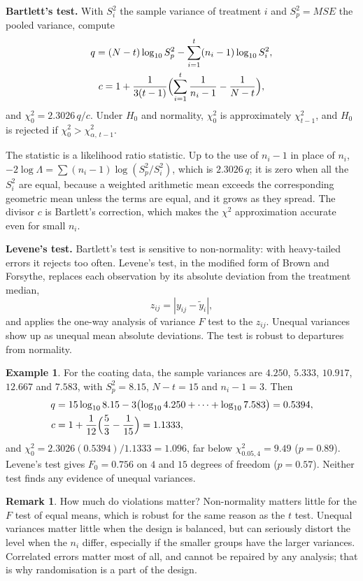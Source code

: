 \documentclass[11pt,a4paper]{article}
\numberwithin{equation}{section}
\theoremstyle{definition}
\newtheorem{exa}[thm]{Example}
\newtheorem*{remark}{Remark}
\begin{document}
\textbf{Bartlett's test.} With $S_i^2$ the sample variance of treatment $i$ and $S_p^2 = MSE$ the pooled variance, compute
\begin{gather*}
q = (N - t)\log_{10}S_p^2 - \sum_{i=1}^t(n_i - 1)\log_{10}S_i^2 , \\
c = 1 + \frac{1}{3(t - 1)}\Bigl(\sum_{i=1}^t\frac{1}{n_i - 1} - \frac{1}{N - t}\Bigr) ,
\end{gather*}
and $\chi_0^2 = 2.3026\,q/c$. Under $H_0$ and normality, $\chi_0^2$ is approximately $\chi^2_{t-1}$, and $H_0$ is rejected if $\chi_0^2 > \chi^2_{\alpha,\,t-1}$.

The statistic is a likelihood ratio statistic. Up to the use of $n_i - 1$ in place of $n_i$, $-2\log\Lambda = \sum(n_i - 1)\log(S_p^2/S_i^2)$, which is $2.3026\,q$; it is
zero when all the $S_i^2$ are equal, because a weighted arithmetic mean exceeds the corresponding geometric mean unless the terms are equal,
and it grows as they spread. The divisor $c$ is Bartlett's correction, which makes the $\chi^2$ approximation accurate even for small $n_i$.

\textbf{Levene's test.} Bartlett's test is sensitive to non-normality: with heavy-tailed errors it rejects too often. Levene's test, in the modified
form of Brown and Forsythe, replaces each observation by its absolute deviation from the treatment median,
\[
z_{ij} = |y_{ij} - \tilde y_i| ,
\]
and applies the one-way analysis of variance $F$ test to the $z_{ij}$. Unequal variances show up as unequal mean absolute deviations. The test is
robust to departures from normality.

\begin{exa}
For the coating data, the sample variances are $4.250$, $5.333$, $10.917$, $12.667$ and $7.583$, with $S_p^2 = 8.15$, $N - t = 15$ and $n_i - 1 = 3$. Then
\begin{align*}
q &= 15\log_{10}8.15 - 3\bigl(\log_{10}4.250 + \dots + \log_{10}7.583\bigr) = 0.5394 , \\
c &= 1 + \frac{1}{12}\Bigl(\frac53 - \frac{1}{15}\Bigr) = 1.1333 ,
\end{align*}
and $\chi_0^2 = 2.3026(0.5394)/1.1333 = 1.096$, far below $\chi^2_{0.05,4} = 9.49$ ($p = 0.89$). Levene's test gives $F_0 = 0.756$ on $4$ and $15$ degrees of freedom
($p = 0.57$). Neither test finds any evidence of unequal variances.
\end{exa}

\begin{remark}
How much do violations matter? Non-normality matters little for the $F$ test of equal means, which is robust for the same reason as the $t$
test. Unequal variances matter little when the design is balanced, but can seriously distort the level when the $n_i$ differ, especially if the smaller
groups have the larger variances. Correlated errors matter most of all, and cannot be repaired by any analysis; that is why randomisation is a
part of the design.
\end{remark}
\end{document}
